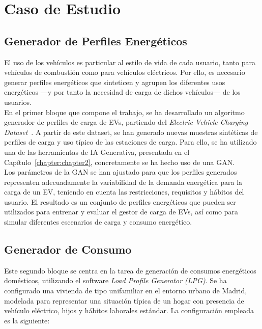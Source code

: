 \chapter{Caso de Estudio}
\section{Generador de Perfiles Energéticos}
El uso de los vehículos es particular al estilo de vida de cada usuario, tanto para vehículos de
combustión como para vehículos eléctricos. Por ello, es necesario generar perfiles energéticos que
sinteticen y agrupen los diferentes usos energéticos —y por tanto la necesidad de carga de dichos
vehículos— de los usuarios.\\

En el primer bloque que compone el trabajo, se ha desarrollado un algoritmo generador de perfiles 
de carga de EVs, partiendo del \textit{Electric Vehicle Charging Dataset}~\cite{kaggle_ev_charging_patterns}.
A partir de este dataset, se han generado nuevas muestras sintéticas de perfiles de carga y uso 
típico de las estaciones de carga. Para ello, se ha utilizado una de las herramientas de IA 
Generativa, presentada en el Capítulo~\ref{chapter:chapter2}, concretamente se ha hecho uso de una
GAN.\\

Los parámetros de la GAN se han ajustado para que los perfiles generados representen adecuadamente
la variabilidad de la demanda energética para la carga de un EV, teniendo en cuenta las restricciones,
requisitos y hábitos del usuario. El resultado es un conjunto de perfiles energéticos que pueden
ser utilizados para entrenar y evaluar el gestor de carga de EVs, así como para simular diferentes
escenarios de carga y consumo energético.

\section{Generador de Consumo}

Este segundo bloque se centra en la tarea de generación de consumos energéticos domésticos,
utilizando el software \textit{Load Profile Generator (LPG)}. Se ha configurado una vivienda de
tipo unifamiliar en el entorno urbano de Madrid, modelada para representar una situación típica
de un hogar con presencia de vehículo eléctrico, hijos y hábitos laborales estándar. La configuración
empleada es la siguiente:

